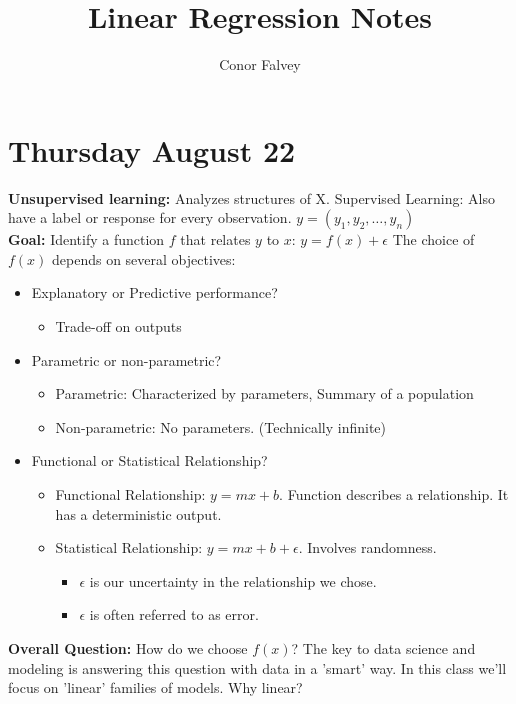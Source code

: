 \documentclass{article}
\title{Linear Regression Notes}
\author{Conor Falvey}
\begin{document}
\maketitle

\section{Thursday August 22}
\textbf{Unsupervised learning:} Analyzes structures of X. 
Supervised Learning: Also have a label or response for every observation.
$y = (y_1, y_2, \ldots, y_n)$\\
\textbf{Goal:} Identify a function $f$ that relates $y$ to $x$: $y = f(x) + \epsilon$
The choice of $f(x)$ depends on several objectives:
\begin{itemize}
    \item Explanatory or Predictive performance?
    \begin{itemize}
        \item Trade-off on outputs
    \end{itemize}
    \item Parametric or non-parametric?
    \begin{itemize}
        \item Parametric: Characterized by parameters, Summary of a population
        \item Non-parametric: No parameters. (Technically infinite)
    \end{itemize}
    \item Functional or Statistical Relationship?
    \begin{itemize}
        \item Functional Relationship: $y = mx + b$. Function describes a relationship. It has a deterministic output.
        \item Statistical Relationship: $y = mx + b + \epsilon$. Involves randomness.
        \begin{itemize}
            \item $\epsilon$ is our uncertainty in the relationship we chose.
            \item $\epsilon$ is often referred to as error.
        \end{itemize}
    \end{itemize}
\end{itemize}
\textbf{Overall Question:} How do we choose $f(x)$?
The key to data science and modeling is answering this question with data in a 'smart' way. In this class we'll focus on 'linear' families of models. Why linear?
\end{document}
